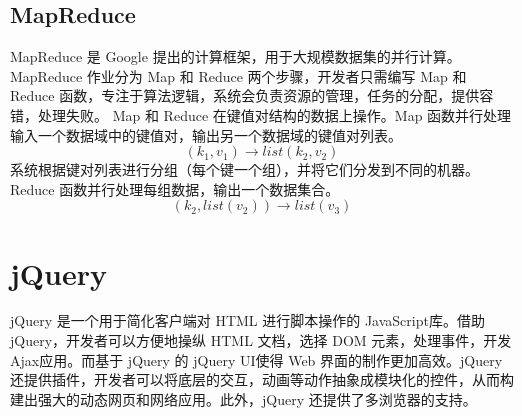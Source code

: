 \subsection{MapReduce}
MapReduce\cite{mr04} 是 Google 提出的计算框架，用于大规模数据集的并行计算。MapReduce 作业分为 Map 和 Reduce 两个步骤，开发者只需编写 Map 和 Reduce 函数，专注于算法逻辑，系统会负责资源的管理，任务的分配，提供容错，处理失败。 Map 和 Reduce 在键值对结构的数据上操作。Map 函数并行处理输入一个数据域中的键值对，输出另一个数据域的键值对列表。
\begin{equation}
(k_1, v_1) \rightarrow list(k_2, v_2)
\end{equation}
系统根据键对列表进行分组（每个键一个组），并将它们分发到不同的机器。Reduce 函数并行处理每组数据，输出一个数据集合。
\begin{equation}
(k_2, list(v_2)) \rightarrow list(v_3)
\end{equation}

\section{jQuery}
jQuery\cite{jquery} 是一个用于简化客户端对 HTML 进行脚本操作的 JavaScript\cite{jsgood}库。借助 jQuery，开发者可以方便地操纵 HTML 文档，选择 DOM 元素，处理事件，开发 Ajax\cite{ajax}应用。而基于 jQuery 的 jQuery UI\cite{jquery-ui}使得 Web 界面的制作更加高效。jQuery 还提供插件，开发者可以将底层的交互，动画等动作抽象成模块化的控件，从而构建出强大的动态网页和网络应用。此外，jQuery 还提供了多浏览器的支持。

